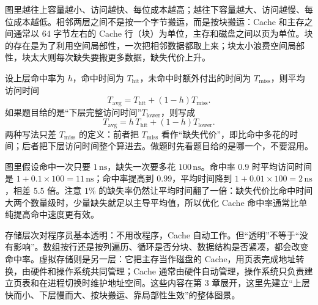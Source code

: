 图里越往上容量越小、访问越快、每位成本越高；越往下容量越大、访问越慢、每位成本越低。相邻两层之间不是按一个字节搬运，而是按块搬运：Cache 和主存之间通常以 64 字节左右的 Cache 行（块）为单位，主存和磁盘之间以页为单位。块的存在是为了利用空间局部性，一次把相邻数据都取上来；块太小浪费空间局部性，块太大则每次缺失要搬更多数据，缺失代价上升。

设上层命中率为 $h$，命中时间为 $T_{\text{hit}}$，未命中时额外付出的时间为 $T_{\text{miss}}$，则平均访问时间
\[
T_{\text{avg}}=T_{\text{hit}}+(1-h)T_{\text{miss}}.
\]
如果题目给的是“下层完整访问时间”$T_{\text{lower}}$，则写成
\[
T_{\text{avg}}=h\,T_{\text{hit}}+(1-h)T_{\text{lower}}.
\]
两种写法只差 $T_{\text{miss}}$ 的定义：前者把 $T_{\text{miss}}$ 看作“缺失代价”，即比命中多花的时间；后者把下层访问时间整个算进去。做题时先看题目给的是哪一个，不要混用。

\begin{center}
\end{center}

图里假设命中一次只要 $1\,\mathrm{ns}$，缺失一次要多花 $100\,\mathrm{ns}$。命中率 $0.9$ 时平均访问时间是 $1+0.1\times100=11\,\mathrm{ns}$；命中率提高到 $0.99$，平均时间降到 $1+0.01\times100=2\,\mathrm{ns}$，相差 $5.5$ 倍。注意 $1\%$ 的缺失率仍然让平均时间翻了一倍：缺失代价比命中时间大两个数量级时，少量缺失就足以主导平均值，所以优化 Cache 命中率通常比单纯提高命中速度更有效。

存储层次对程序员基本透明：不用改程序，Cache 自动工作。但“透明”不等于“没有影响”。数组按行还是按列遍历、循环是否分块、数据结构是否紧凑，都会改变命中率。虚拟存储则是另一层：它把主存当作磁盘的 Cache，用页表完成地址转换，由硬件和操作系统共同管理；Cache 通常由硬件自动管理，操作系统只负责建立页表和在进程切换时维护地址空间。这些内容在第 3 章展开，这里先建立“上层快而小、下层慢而大、按块搬运、靠局部性生效”的整体图景。

